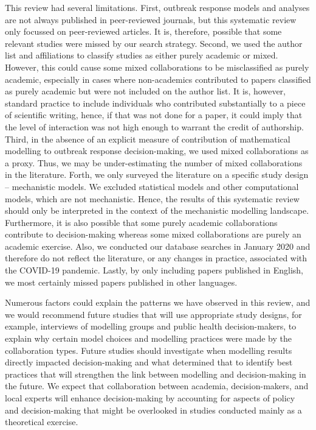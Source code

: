\documentclass[10pt,letterpaper]{article}
\begin{document}
This review had several limitations. First, outbreak response models and analyses are not always published in peer-reviewed journals, but this systematic review only focussed on peer-reviewed articles. It is, therefore, possible that some relevant studies were missed by our search strategy. Second, we used the author list and affiliations to classify studies as either purely academic or mixed. However, this could cause some mixed collaborations to be misclassified as purely academic, especially in cases where non-academics contributed to papers classified as purely academic but were not included on the author list. It is, however, standard practice to include individuals who contributed substantially to a piece of scientific writing, hence, if that was not done for a paper, it could imply that the level of interaction was not high enough to warrant the credit of authorship. Third, in the absence of an explicit measure of contribution of mathematical modelling to outbreak response decision-making, we used mixed collaborations as a proxy. Thus, we may be under-estimating the number of mixed collaborations in the literature. Forth, we only surveyed the literature on a specific study design – mechanistic models. We excluded statistical models and other computational models, which are not mechanistic. Hence, the results of this systematic review should only be interpreted in the context of the mechanistic modelling landscape. Furthermore, it is also possible that some purely academic collaborations contribute to decision-making whereas some mixed collaborations are purely an academic exercise. Also, we  conducted our database searches in January 2020 and therefore do not reflect the literature, or any changes in practice, associated with the COVID-19 pandemic. Lastly, by only including papers published in English, we most certainly missed papers published in other languages.  

Numerous factors could explain the patterns we have observed in this review, and we would recommend future studies that will use appropriate study designs, for example, interviews of modelling groups and public health decision-makers, to explain why certain model choices and modelling practices were made by the collaboration types. Future studies should investigate when modelling results directly impacted decision-making and what determined that to identify best practices that will strengthen the link between modelling and decision-making in the future. We expect that collaboration between academia, decision-makers, and local experts will enhance decision-making by accounting for aspects of policy and decision-making that might be overlooked in studies conducted mainly as a theoretical exercise. 
\end{document}
